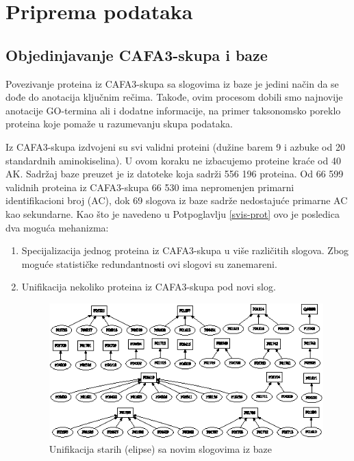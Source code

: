 
\chapter{Priprema podataka} %

\label{Priprema_podataka} %

\section{Objedinjavanje CAFA3-skupa i baze \swissprot}
\label{objedinjavanje}

Povezivanje proteina iz CAFA3-skupa sa slogovima iz baze \swissprot je jedini
način da se dođe do anotacija ključnim rečima. Takođe, ovim procesom dobili smo
najnovije anotacije GO-termina ali i dodatne informacije, na primer taksonomsko
poreklo proteina koje pomaže u razumevanju skupa podataka.

Iz CAFA3-skupa izdvojeni su svi validni proteini (dužine barem 9 i azbuke od 20
standardnih aminokiselina). U ovom koraku ne izbacujemo proteine kraće od 40
AK.  Sadržaj baze \swissprot preuzet je iz datoteke
 \cite{sprot} koja sadrži 556 196 proteina.
Od 66 599 validnih proteina iz CAFA3-skupa 66 530 ima nepromenjen primarni
identifikacioni broj (AC), dok 69 slogova iz baze \swissprot sadrže nedostajuće
primarne AC kao sekundarne. Kao što je navedeno u Potpoglavlju \ref{svis-prot}
ovo je posledica dva moguća mehanizma:

\begin{enumerate}
  \item Specijalizacija jednog proteina iz CAFA3-skupa u više različitih
    slogova.  Zbog moguće statističke redundantnosti ovi slogovi su zanemareni.

  \item Unifikacija nekoliko proteina iz CAFA3-skupa pod novi slog.

  \begin{figure}[th]
  \centering
  \includegraphics[scale=2]{plots/unifikacija_slogova2.eps}
  \caption{Unifikacija starih (elipse) sa novim slogovima iz baze \swissprot}
  \label{fig:unifikacija_slogova}
  \end{figure}

\end{enumerate}

